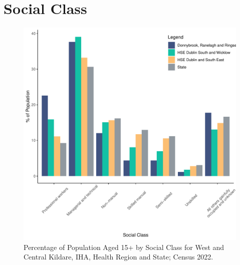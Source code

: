 \documentclass{article}
\begin{document}
\section{Social Class}\label{sect:SC}
\begin{figure}[H]
	\centering
	\includegraphics[width = 140mm]{../figures/SocialClassED.pdf}
	\caption{Percentage of Population Aged 15+ by Social Class for West and Central Kildare, IHA, Health Region and State; Census 2022.}
	\label{fig:vbnv}
	\end{figure}
\end{document}
